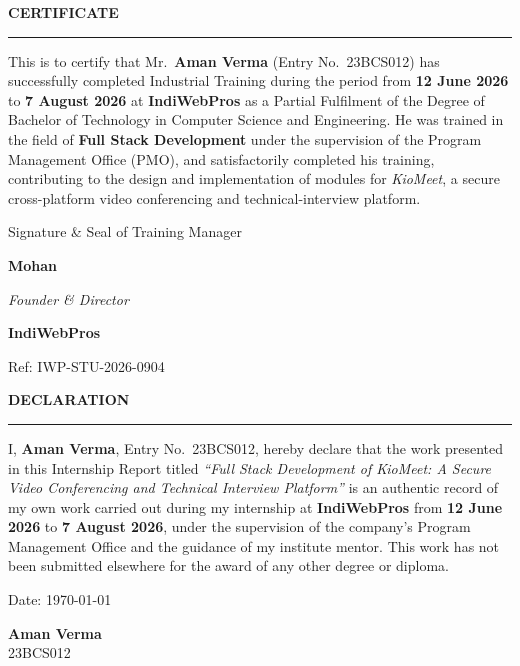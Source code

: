 \documentclass[12pt,oneside,a4paper]{report}
\newcommand{\rfrontheading}[1]{%
  \begin{center}
    {\fontsize{14}{17}\selectfont\bfseries #1\par}
  \end{center}
  \noindent\rule{\textwidth}{0.8pt}\par\vspace{10pt}
}
\begin{document}

\thispagestyle{empty}
\rfrontheading{CERTIFICATE}
\noindent
This is to certify that Mr.\ \textbf{Aman Verma} (Entry No.\ 23BCS012) has
successfully completed Industrial Training during the period from
\textbf{12 June 2026} to \textbf{7 August 2026} at \textbf{IndiWebPros} as a
Partial Fulfilment of the Degree of Bachelor of Technology in Computer
Science and Engineering. He was trained in the field of \textbf{Full Stack
Development} under the supervision of the Program Management Office (PMO),
and satisfactorily completed his training, contributing to the design and
implementation of modules for \textit{KioMeet}, a secure cross-platform video
conferencing and technical-interview platform.

\vspace{1.6cm}
\noindent
\begin{minipage}[t]{0.55\textwidth}
Signature \& Seal of Training Manager\par
\vspace{0.4cm}
\textbf{Mohan}\par
\textit{Founder \& Director}\par
\textbf{IndiWebPros}\par
Ref: IWP-STU-2026-0904
\end{minipage}

\clearpage
\rfrontheading{DECLARATION}
\noindent
I, \textbf{Aman Verma}, Entry No.\ 23BCS012, hereby declare that the work
presented in this Internship Report titled \textit{``Full Stack Development
of KioMeet: A Secure Video Conferencing and Technical Interview Platform''}
is an authentic record of my own work carried out during my internship at
\textbf{IndiWebPros} from \textbf{12 June 2026} to \textbf{7 August 2026},
under the supervision of the company's Program Management Office and the
guidance of my institute mentor. This work has not been submitted elsewhere
for the award of any other degree or diploma.

\vspace{1.6cm}
\noindent
\begin{minipage}[t]{0.5\textwidth}
Date: \today
\end{minipage}%
\begin{minipage}[t]{0.5\textwidth}
\raggedleft
\textbf{Aman Verma}\\
23BCS012
\end{minipage}
\end{document}
